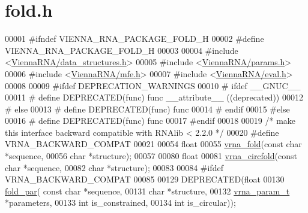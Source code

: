 \hypertarget{fold_8h_source}{}\section{fold.\+h}
\label{fold_8h_source}

\begin{DoxyCode}
00001 \textcolor{preprocessor}{#ifndef VIENNA\_RNA\_PACKAGE\_FOLD\_H}
00002 \textcolor{preprocessor}{#define VIENNA\_RNA\_PACKAGE\_FOLD\_H}
00003 
00004 \textcolor{preprocessor}{#include <\hyperlink{data__structures_8h}{ViennaRNA/data\_structures.h}>}
00005 \textcolor{preprocessor}{#include <\hyperlink{params_8h}{ViennaRNA/params.h}>}
00006 \textcolor{preprocessor}{#include <\hyperlink{mfe_8h}{ViennaRNA/mfe.h}>}
00007 \textcolor{preprocessor}{#include <\hyperlink{eval_8h}{ViennaRNA/eval.h}>}
00008 
00009 \textcolor{preprocessor}{#ifdef DEPRECATION\_WARNINGS}
00010 \textcolor{preprocessor}{# ifdef \_\_GNUC\_\_}
00011 \textcolor{preprocessor}{#  define DEPRECATED(func) func \_\_attribute\_\_ ((deprecated))}
00012 \textcolor{preprocessor}{# else}
00013 \textcolor{preprocessor}{#  define DEPRECATED(func) func}
00014 \textcolor{preprocessor}{# endif}
00015 \textcolor{preprocessor}{#else}
00016 \textcolor{preprocessor}{# define DEPRECATED(func) func}
00017 \textcolor{preprocessor}{#endif}
00018 
00019 \textcolor{comment}{/* make this interface backward compatible with RNAlib < 2.2.0 */}
00020 \textcolor{preprocessor}{#define VRNA\_BACKWARD\_COMPAT}
00021 
00054 \textcolor{keywordtype}{float}
00055 \hyperlink{group__mfe__fold__single_ga29a33b2895f4e67b0480271ff289afdc}{vrna\_fold}(\textcolor{keyword}{const} \textcolor{keywordtype}{char} *sequence,
00056           \textcolor{keywordtype}{char} *structure);
00057 
00080 \textcolor{keywordtype}{float}
00081 \hyperlink{group__mfe__fold__single_gaf973483d8acbc8cc9aacfc8a9b7f0074}{vrna\_circfold}(\textcolor{keyword}{const} \textcolor{keywordtype}{char} *sequence,
00082               \textcolor{keywordtype}{char} *structure);
00083 
00084 \textcolor{preprocessor}{#ifdef  VRNA\_BACKWARD\_COMPAT}
00085 
00129 DEPRECATED(\textcolor{keywordtype}{float}
00130 \hyperlink{group__mfe__fold__single_ga2bc41df5d71fee6fd8da9904ee65d8fb}{fold\_par}( \textcolor{keyword}{const} \textcolor{keywordtype}{char} *sequence,
00131           \textcolor{keywordtype}{char} *structure,
00132           \hyperlink{group__energy__parameters_structvrna__param__s}{vrna\_param\_t} *parameters,
00133           \textcolor{keywordtype}{int} is\_constrained,
00134           \textcolor{keywordtype}{int} is\_circular));

\end{DoxyCode}
